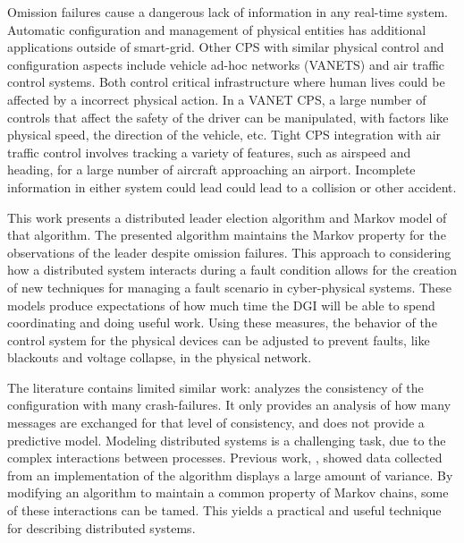 Omission failures cause a dangerous lack of information in any real-time system.
Automatic configuration and management of physical entities has additional applications outside of smart-grid.
Other CPS with similar physical control and configuration aspects include vehicle ad-hoc networks (VANETS)\cite{CARS1}\cite{CARS2} and air traffic control systems\cite{AIRTRAFFIC1}.
Both control critical infrastructure where human lives could be affected by a incorrect physical action.
In a VANET CPS, a large number of controls that affect the safety of the driver can be manipulated, with factors like physical speed, the direction of the vehicle, etc.
Tight CPS integration with air traffic control involves tracking a variety of features, such as airspeed and heading, for a large number of aircraft approaching an airport\cite{AIRTRAFFIC2}.
Incomplete information in either system could lead could lead to a collision or other accident.

This work presents a distributed leader election algorithm and Markov model of that algorithm.
The presented algorithm maintains the Markov property for the observations of the leader despite omission\cite{OMISSIONFAILURES} failures.
This approach to considering how a distributed system interacts during a fault condition allows for the creation of new techniques for managing a fault scenario in cyber-physical systems.
These models produce expectations of how much time the DGI will be able to spend coordinating and doing useful work.
Using these measures, the behavior of the control system for the physical devices can be adjusted to prevent faults, like blackouts and voltage collapse, in the physical network.

The literature contains limited similar work: \cite{LEADERELECTIONEVAL} analyzes the consistency of the configuration with many crash-failures.
It only provides an analysis of how many messages are exchanged for that level of consistency, and does not provide a predictive model.
Modeling distributed systems is a challenging task, due to the complex interactions between processes.
Previous work, \cite{CRITIS2012}, showed data collected from an implementation of the algorithm displays a large amount of variance.
By modifying an algorithm to maintain a common property of Markov chains, some of these interactions can be tamed.
This yields a practical and useful technique for describing distributed systems.
